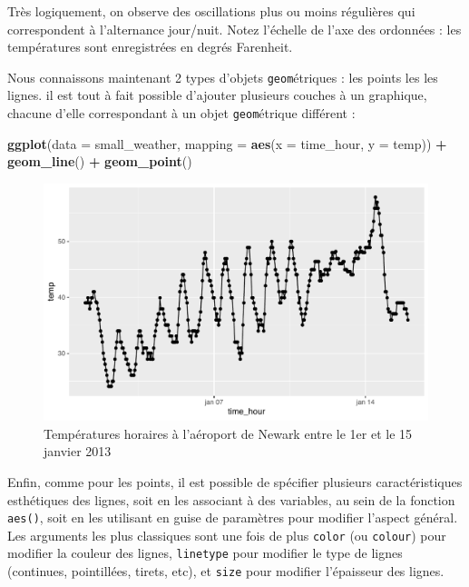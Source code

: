\documentclass[a4paperpaper,]{article}
\newenvironment{Shaded}{\begin{snugshade}}{\end{snugshade}}
\newcommand{\KeywordTok}[1]{\textcolor[rgb]{0.13,0.29,0.53}{\textbf{#1}}}
\newcommand{\DataTypeTok}[1]{\textcolor[rgb]{0.13,0.29,0.53}{#1}}
\newcommand{\StringTok}[1]{\textcolor[rgb]{0.31,0.60,0.02}{#1}}
\newcommand{\OperatorTok}[1]{\textcolor[rgb]{0.81,0.36,0.00}{\textbf{#1}}}
\newcommand{\NormalTok}[1]{#1}
\theoremstyle{definition}
\theoremstyle{definition}
\theoremstyle{definition}
\theoremstyle{remark}
\begin{document}
Très logiquement, on observe des oscillations plus ou moins régulières
qui correspondent à l'alternance jour/nuit. Notez l'échelle de l'axe des
ordonnées : les températures sont enregistrées en degrés Farenheit.

Nous connaissons maintenant 2 types d'objets \texttt{geom}étriques : les
points les les lignes. il est tout à fait possible d'ajouter plusieurs
couches à un graphique, chacune d'elle correspondant à un objet
\texttt{geom}étrique différent :

\begin{Shaded}
\begin{Highlighting}[]
\KeywordTok{ggplot}\NormalTok{(}\DataTypeTok{data =}\NormalTok{ small_weather, }\DataTypeTok{mapping =} \KeywordTok{aes}\NormalTok{(}\DataTypeTok{x =}\NormalTok{ time_hour, }\DataTypeTok{y =}\NormalTok{ temp)) }\OperatorTok{+}
\StringTok{  }\KeywordTok{geom_line}\NormalTok{() }\OperatorTok{+}
\StringTok{  }\KeywordTok{geom_point}\NormalTok{()}
\end{Highlighting}
\end{Shaded}

\begin{figure}[htpb]

{\centering \includegraphics[width=0.9\linewidth]{figure/lineplotgraph-1} 

}

\caption{Températures horaires à l'aéroport de Newark entre le 1er et le 15 janvier 2013}\label{fig:lineplotgraph}
\end{figure}

Enfin, comme pour les points, il est possible de spécifier plusieurs
caractéristiques esthétiques des lignes, soit en les associant à des
variables, au sein de la fonction \texttt{aes()}, soit en les utilisant
en guise de paramètres pour modifier l'aspect général. Les arguments les
plus classiques sont une fois de plus \texttt{color} (ou
\texttt{colour}) pour modifier la couleur des lignes, \texttt{linetype}
pour modifier le type de lignes (continues, pointillées, tirets, etc),
et \texttt{size} pour modifier l'épaisseur des lignes.
\end{document}

